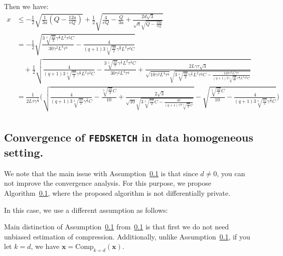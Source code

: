 Then we have:
\begin{align}
    x&\leq -\frac{1}{2}\sqrt{\frac{1}{3a}\left(Q-\frac{12a}{eQ}\right)}+\frac{1}{2}\sqrt{\frac{4}{eQ}-\frac{Q}{3a}+\frac{2d\sqrt{3}}{\sqrt{a}\sqrt{Q-\frac{12a}{e Q}}}}\nonumber\\
    &=-\frac{1}{2}\sqrt{\frac{3\sqrt[3]{\frac{10}{2}}\gamma^{\frac{4}{3}} L^2\tau^2 C}{30\gamma^2L^4\tau^4}-\frac{4}{(q+1)3\sqrt[3]{\frac{10}{2}}\gamma^{\frac{4}{3}} L^2\tau^2 C}}\nonumber\\
    &\quad+\frac{1}{2}\sqrt{\frac{4}{(q+1)3\sqrt[3]{\frac{10}{2}}\gamma^{\frac{4}{3}} L^2\tau^2 C}-\frac{3\sqrt[3]{\frac{10}{2}}\gamma^{\frac{4}{3}} L^2\tau^2 C}{30\gamma^2L^4\tau^4}+\frac{2L\gamma\tau\sqrt{3}}{\sqrt{10\gamma^2L^4\tau^4}\sqrt{3\sqrt[3]{\frac{10}{2}}\gamma^{\frac{4}{3}} L^2\tau^2 C-\frac{120 \gamma^2L^4\tau^4}{(q+1) 3\sqrt[3]{\frac{10}{2}}\gamma^{\frac{4}{3}} L^2\tau^2 C}}}}\nonumber\\
    &=\frac{1}{2L\tau\gamma^{\frac{1}{3}}}\Big(\sqrt{\frac{4}{(q+1)3\sqrt[3]{\frac{10}{2}}\gamma^{\frac{2}{3}} C}-\frac{\sqrt[3]{\frac{10}{2}} C}{10}+\frac{2\sqrt{3}}{\sqrt{10}\sqrt{3\sqrt[3]{\frac{10}{2}} C-\frac{40 }{(q+1)\gamma^{\frac{2}{3}} \sqrt[3]{\frac{10}{2}} C}}}}-\sqrt{\frac{\sqrt[3]{\frac{10}{2}} C}{10}-\frac{4}{(q+1)3\sqrt[3]{\frac{10}{2}}\gamma^{\frac{2}{3}} C}}\Big)\nonumber\\
\end{align}
\subsection{Convergence of \texttt{FEDSKETCH} in data homogeneous setting.} 

We note that the main issue with Assumption~\ref{} is that since $d\neq 0$, you can not improve the convergence analysis. For this purpose, we propose Algorithm~\ref{}, where the proposed algorithm is not differentially private.

In this case, we use a different assumption as follows:

\begin{remark}
Main distinction of Assumption~\ref{} from~\ref{} is that first we do not need unbiased estimation of compression. Additionally, unlike Assumption~\ref{}, if you let $k=d$, we have $\boldsymbol{x}=\text{Comp}_{k=d}(\boldsymbol{x})$.    
\end{remark}




